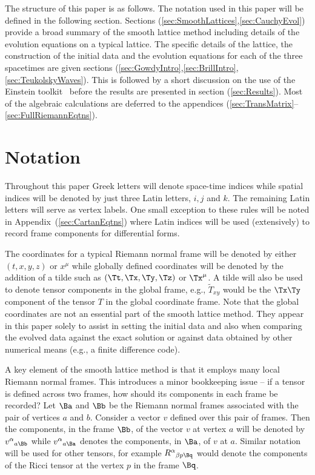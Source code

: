 \documentclass[a4paper,12pt]{article}
\numberwithin{equation}{section}
\begin{document}
The structure of this paper is as follows. The notation used in this paper will be defined
in the following section. Sections (\ref{sec:SmoothLattices},\ref{sec:CauchyEvol}) provide a
broad summary of the smooth lattice method including details of the evolution equations on a
typical lattice. The specific details of the lattice, the construction of the initial data
and the evolution equations for each of the three spacetimes are given sections
(\ref{sec:GowdyIntro},\ref{sec:BrillIntro},\ref{sec:TeukolskyWaves}). This is followed by a
short discussion on the use of the Einstein toolkit~\cite{loffler:2011-01} before the
results are presented in section (\ref{sec:Results}). Most of the algebraic calculations are
deferred to the appendices (\ref{sec:TransMatrix}--\ref{sec:FullRiemannEqtns}).

\section{Notation}
\label{sec:Notation}

Throughout this paper Greek letters will denote space-time indices while spatial indices
will be denoted by just three Latin letters, $i,j$ and $k$. The remaining Latin letters will
serve as vertex labels. One small exception to these rules will be noted in
Appendix~(\ref{sec:CartanEqtns}) where Latin indices will be used (extensively) to record
frame components for differential forms.

The coordinates for a typical Riemann normal frame will be denoted by either $(t,x,y,z)$
or $x^\mu$ while globally defined coordinates will be denoted by the addition of a tilde
such as $(\Tt,\Tx,\Ty,\Tz)$ or ${\Tx}^\mu$. A tilde will also be used to denote tensor
components in the global frame, e.g., ${\tilde{T}_{xy}}$ would be the $\Tx\Ty$ component
of the tensor $T$ in the global coordinate frame. Note that the global coordinates are
not an essential part of the smooth lattice method. They appear in this paper solely to
assist in setting the initial data and also when comparing the evolved data against
the exact solution or against data obtained by other numerical means (e.g., a finite
difference code).

A key element of the smooth lattice method is that it employs many local Riemann normal
frames. This introduces a minor bookkeeping issue -- if a tensor is defined across two
frames, how should its components in each frame be recorded? Let $\Ba$ and $\Bb$ be the
Riemann normal frames associated with the pair of vertices $a$ and $b$. Consider a
vector $v$ defined over this pair of frames. Then the components, in the frame $\Bb$, of
the vector $v$ at vertex $a$ will be denoted by $v^\alpha{}_{a\Bb}$ while
$v^\alpha{}_{a\Ba}$ denotes the components, in $\Ba$, of $v$ at $a$. Similar notation
will be used for other tensors, for example $R^\alpha{}_{\beta p\Bq}$ would denote the
components of the Ricci tensor at the vertex $p$ in the frame $\Bq$.
\end{document}
